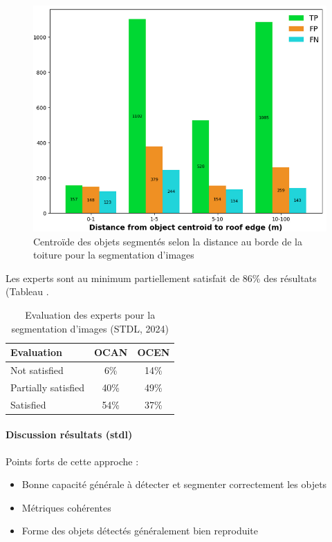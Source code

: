 {{{{\begin{figure}[H]
    \centering
    \includegraphics[width=1\linewidth]{02-main//figures/stdl_11_segmentation_image_distance.png}
    \caption{Centroïde des objets segmentés selon la distance au borde de la toiture pour la segmentation d’images  \cite{herny_detection_2024}}
    \label{fig:stdl_11_segmentation_image_distance}
\end{figure}

\par{Les experts sont au minimum partiellement satisfait de 86\% des résultats (Tableau .}
\begin{table}[h]
    \centering
    \begin{tabular}{|l|c|c|}
    \hline
    Evaluation & OCAN & OCEN \\
    \hline
    Not satisfied & 6\% & 14\% \\
    Partially satisfied & 40\% & 49\% \\
    Satisfied & 54\% & 37\% \\
    \hline
    \end{tabular}
    \caption{Evaluation des experts pour la segmentation d'images (STDL, 2024)}
    \label{tab:stdl_07_segmentation_image_resultats_experts}
\end{table}
\newpage
\paragraph{Discussion résultats (\acrshort{stdl})}

\par{Points forts de cette approche :}
\begin{itemize}
\item Bonne capacité générale à détecter et segmenter correctement les objets
\item Métriques cohérentes
\item Forme des objets détectés généralement bien reproduite
\end{itemize}

}}}}
